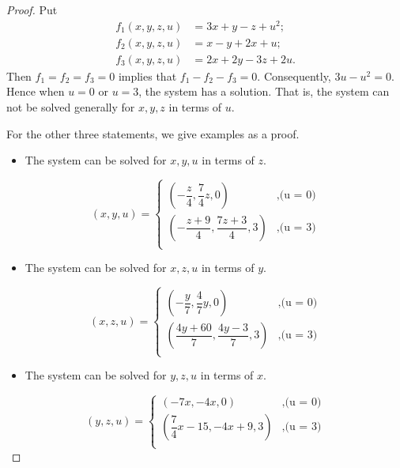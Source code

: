 \begin{Exercise}
	\begin{proof}
		Put
		\begin{align*}
		f_1(x,y,z,u) &= 3x+y-z+u^2; \\
		f_2(x,y,z,u) &= x-y+2x+u; \\
		f_3(x,y,z,u) &= 2x+2y-3z+2u.
		\end{align*}
		Then $f_1 = f_2 = f_3 = 0$ implies that $f_1 - f_2 - f_3 = 0$.
		Consequently, $3u - u^2 = 0$.
		Hence when $u = 0$ or $u = 3$, the system has a solution.
		That is, the system can not be solved generally for $x,y,z$ in terms of $u$.
		
		For the other three statements, we give examples as a proof.
		\begin{itemize}
			\item The system can be solved for $x,y,u$ in terms of $z$.
		\end{itemize}
		$$
		(x,y,u) = \begin{cases}
		\left( -\dfrac{z}{4}, \dfrac{7}{4}z, 0 \right) &, \mbox{(u = 0)}\\
		\left( -\dfrac{z+9}{4}, \dfrac{7z+3}{4}, 3 \right) &, \mbox{(u = 3)}\\
		\end{cases}
		$$
		
		\begin{itemize}
			\item The system can be solved for $x,z,u$ in terms of $y$.
		\end{itemize}
		$$
		(x,z,u) = \begin{cases}
		\left( -\dfrac{y}{7}, \dfrac{4}{7}y, 0 \right) &, \mbox{(u = 0)}\\
		\left( \dfrac{4y+60}{7}, \dfrac{4y-3}{7}, 3 \right) &, \mbox{(u = 3)}\\
		\end{cases}
		$$
		
		\begin{itemize}
			\item The system can be solved for $y,z,u$ in terms of $x$.
		\end{itemize}
		$$
		(y,z,u) = \begin{cases}
		\left( -7x, -4x, 0 \right) &, \mbox{(u = 0)}\\
		\left( \dfrac{7}{4}x-15, -4x+9, 3 \right) &, \mbox{(u = 3)}\\
		\end{cases}
		$$
	\end{proof}
	
\end{Exercise}
